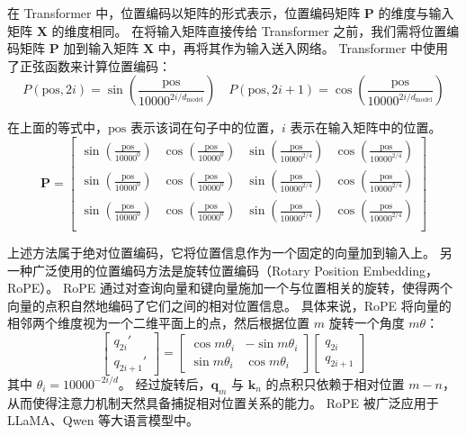 在 Transformer 中，位置编码以矩阵的形式表示，位置编码矩阵 $\boldsymbol{P}$ 的维度与输入矩阵 $\boldsymbol{X}$ 的维度相同。
在将输入矩阵直接传给 Transformer 之前，我们需将位置编码矩阵 $\boldsymbol{P}$ 加到输入矩阵 $\boldsymbol{X}$ 中，再将其作为输入送入网络。
Transformer 中使用了正弦函数来计算位置编码：
\begin{equation*}
	P(\text{pos}, 2i) = \sin (\frac{\text{pos}}{10000^{2i/d_{\text{model}}}}) \quad
	P(\text{pos}, 2i+1) = \cos (\frac{\text{pos}}{10000^{2i/d_{\text{model}}}})
\end{equation*}

在上面的等式中，$\text{pos}$ 表示该词在句子中的位置，$i$ 表示在输入矩阵中的位置。
$$
	\boldsymbol{P} =
	\begin{bmatrix}
		\sin\left(\frac{\text{pos}}{10000^0}\right) & \cos\left(\frac{\text{pos}}{10000^0}\right) & \sin\left(\frac{\text{pos}}{10000^{2/4}}\right) & \cos\left(\frac{\text{pos}}{10000^{2/4}}\right) \\
		\sin\left(\frac{\text{pos}}{10000^0}\right) & \cos\left(\frac{\text{pos}}{10000^0}\right) & \sin\left(\frac{\text{pos}}{10000^{2/4}}\right) & \cos\left(\frac{\text{pos}}{10000^{2/4}}\right) \\
		\sin\left(\frac{\text{pos}}{10000^0}\right) & \cos\left(\frac{\text{pos}}{10000^0}\right) & \sin\left(\frac{\text{pos}}{10000^{2/4}}\right) & \cos\left(\frac{\text{pos}}{10000^{2/4}}\right) \\
	\end{bmatrix}
$$

上述方法属于绝对位置编码，它将位置信息作为一个固定的向量加到输入上。
另一种广泛使用的位置编码方法是旋转位置编码（Rotary Position Embedding，RoPE）。
RoPE 通过对查询向量和键向量施加一个与位置相关的旋转，使得两个向量的点积自然地编码了它们之间的相对位置信息。
具体来说，RoPE 将向量的相邻两个维度视为一个二维平面上的点，然后根据位置 $m$ 旋转一个角度 $m\theta$：
$$
	\begin{bmatrix} q_{2i}' \\ q_{2i+1}' \end{bmatrix}
	=
	\begin{bmatrix} \cos m\theta_i & -\sin m\theta_i \\ \sin m\theta_i & \cos m\theta_i \end{bmatrix}
	\begin{bmatrix} q_{2i} \\ q_{2i+1} \end{bmatrix}
$$
其中 $\theta_i = 10000^{-2i/d}$。
经过旋转后，$\boldsymbol{q}_m$ 与 $\boldsymbol{k}_n$ 的点积只依赖于相对位置 $m - n$，从而使得注意力机制天然具备捕捉相对位置关系的能力。
RoPE 被广泛应用于 LLaMA、Qwen 等大语言模型中。

